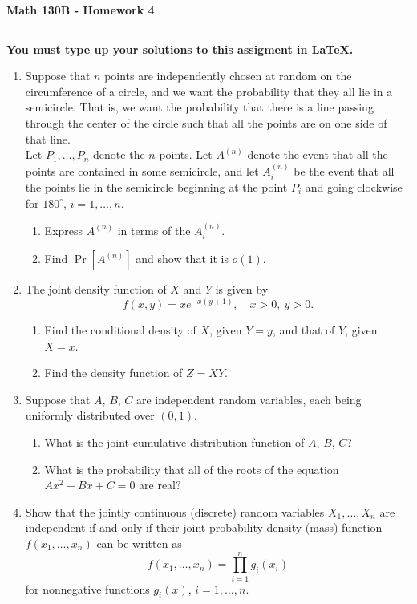 \documentclass[11pt,letterpaper]{report}
\begin{document}
\begin{center}
{\bf \Large Math 130B - Homework 4}
\vspace{0.2cm}
\hrule
\end{center}


\centerline{\textbf{You must type up your solutions to this assigment in \LaTeX.}}
\begin{enumerate}
	\item Suppose that $n$ points are independently chosen at random on the circumference of a circle, and we want the probability that they all lie in a semicircle. That is, we want the probability that there is a line passing through the center of the circle such that all the points are on one side of that line.\\

	\noindent Let $P_1, \ldots, P_n$ denote the $n$ points. Let $A^{(n)}$ denote the event that all the points are contained in some semicircle, and let $A^{(n)}_i$ be the event that all the points lie in the semicircle beginning at the point $P_i$ and going clockwise for $180^\circ$, $i = 1, \ldots, n$.
	\begin{enumerate}
		\item Express $A^{(n)}$ in terms of the $A^{(n)}_i$.
		\item Find $\Pr[A^{(n)}]$ and show that it is $o(1)$.
	\end{enumerate}


	\item The joint density function of $X$ and $Y$ is given by
	\[
	f(x,y) = xe^{-x(y+1)},\quad x>0,\ y>0.
	\]
	\begin{enumerate}
		\item Find the conditional density of $X$, given $Y = y$, and that of $Y$, given $X = x$.
		\item Find the density function of $Z = XY$.
	\end{enumerate}

	\item Suppose that $A$, $B$, $C$ are independent random variables, each being uniformly distributed over $(0, 1)$.
	\begin{enumerate}
		\item What is the joint cumulative distribution function of $A$, $B$, $C$?
		\item What is the probability that all of the roots of the equation $Ax^2 + Bx + C = 0$ are real?
	\end{enumerate}

	\item Show that the jointly continuous (discrete) random variables $X_1, \ldots, X_n$ are independent if and only if their joint probability density (mass) function $f(x_1, \ldots, x_n)$ can be written as
	\[
	f(x_1, \ldots, x_n) = \prod_{i=1}^ng_i(x_i)
	\]
	for nonnegative functions $g_i(x)$, $i= 1, \ldots, n$.



\end{enumerate}
\end{document}
